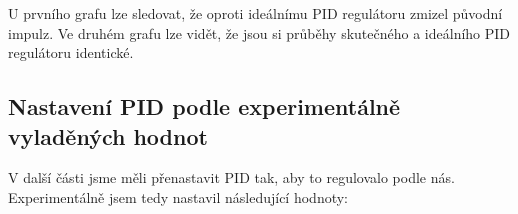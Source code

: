 \documentclass{article}
\begin{document}
	   		
	\indent U prvního grafu lze sledovat, že oproti ideálnímu PID regulátoru zmizel původní impulz. Ve druhém grafu lze vidět, že jsou si průběhy skutečného a ideálního PID regulátoru identické.

\subsection{Nastavení PID podle experimentálně vyladěných hodnot}	
	
	\indent V další části jsme měli přenastavit PID tak, aby to regulovalo podle nás. Experimentálně jsem tedy nastavil následující hodnoty: 
	
	
	\begin{table}[H]
\centering
{}
\caption{Odladěné hodnoty pro skutečný PID}
\label{tab:pid_ideal_lad}
\end{table}
\end{document}
